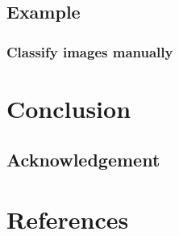 \documentclass[article,nojss]{jss}
\begin{document}
\lipsum[2]

\hypertarget{example}{%
\subsection{Example}\label{example}}

\hypertarget{classify-images-manually}{%
\subsubsection{Classify images
manually}\label{classify-images-manually}}

\lipsum[2]

\lipsum[2]

\hypertarget{conclusion}{%
\section{Conclusion}\label{conclusion}}

\lipsum[2]

\hypertarget{acknowledgement}{%
\subsection{Acknowledgement}\label{acknowledgement}}

\lipsum[2]

\hypertarget{references}{%
\section*{References}\label{references}}
\end{document}
